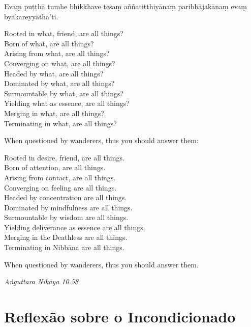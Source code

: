 Evaṃ puṭṭhā tumhe bhikkhave tesaṃ aññatitthiyānaṃ paribbājakānaṃ evaṃ byākareyyāthā'ti.

\begin{english}
  Rooted in what, friend, are all things?\\
  Born of what, are all things?\\
  Arising from what, are all things?\\
  Converging on what, are all things?\\
  Headed by what, are all things?\\
  Dominated by what, are all things?\\
  Surmountable by what, are all things?\\
  Yielding what as essence, are all things?\\
  Merging in what, are all things?\\
  Terminating in what, are all things?

  \bigskip

  When questioned by wanderers, thus you should answer them:

  \bigskip

  Rooted in desire, friend, are all things.\\
  Born of attention, are all things.\\
  Arising from contact, are all things.\\
  Converging on feeling are all things.\\
  Headed by concentration are all things.\\
  Dominated by mindfulness are all things.\\
  Surmountable by wisdom are all things.\\
  Yielding deliverance as essence are all things.\\
  Merging in the Deathless are all things.\\
  Terminating in Nibbāna are all things.

  \bigskip

  When questioned by wanderers, thus you should answer them.
\end{english}

{\raggedleft
  \emph{Aṅguttara Nikāya 10.58}
\par}

\chapter[Incondicionado]{Reflexão sobre o Incondicionado}

